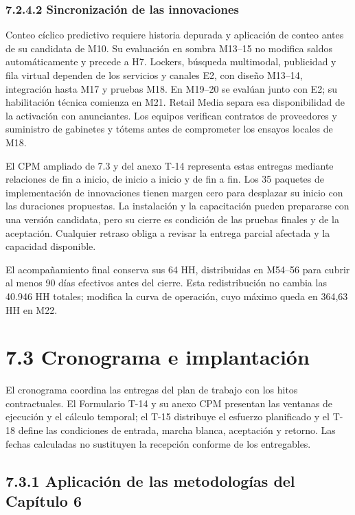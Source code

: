 \documentclass[11pt]{article}
\begin{document}
\subsubsection{7.2.4.2 Sincronización de las innovaciones}

Conteo cíclico predictivo requiere historia depurada y aplicación de conteo antes de su candidata de M10. Su evaluación en sombra M13–15 no modifica saldos automáticamente y precede a H7. Lockers, búsqueda multimodal, publicidad y fila virtual dependen de los servicios y canales E2, con diseño M13–14, integración hasta M17 y pruebas M18. En M19–20 se evalúan junto con E2; su habilitación técnica comienza en M21. Retail Media separa esa disponibilidad de la activación con anunciantes. Los equipos verifican contratos de proveedores y suministro de gabinetes y tótems antes de comprometer los ensayos locales de M18.

El CPM ampliado de 7.3 y del anexo T-14 representa estas entregas mediante relaciones de fin a inicio, de inicio a inicio y de fin a fin. Los 35 paquetes de implementación de innovaciones tienen margen cero para desplazar su inicio con las duraciones propuestas. La instalación y la capacitación pueden prepararse con una versión candidata, pero su cierre es condición de las pruebas finales y de la aceptación. Cualquier retraso obliga a revisar la entrega parcial afectada y la capacidad disponible.

El acompañamiento final conserva sus 64 HH, distribuidas en M54–56 para cubrir al menos 90 días efectivos antes del cierre. Esta redistribución no cambia las 40.946 HH totales; modifica la curva de operación, cuyo máximo queda en 364,63 HH en M22.


\section{7.3 Cronograma e implantación}\label{cronograma-e-implantaciuxf3n}

El cronograma coordina las entregas del plan de trabajo con los hitos contractuales. El Formulario T-14 y su anexo CPM presentan las ventanas de ejecución y el cálculo temporal; el T-15 distribuye el esfuerzo planificado y el T-18 define las condiciones de entrada, marcha blanca, aceptación y retorno. Las fechas calculadas no sustituyen la recepción conforme de los entregables.

\subsection{7.3.1 Aplicación de las metodologías del Capítulo 6}
\end{document}
